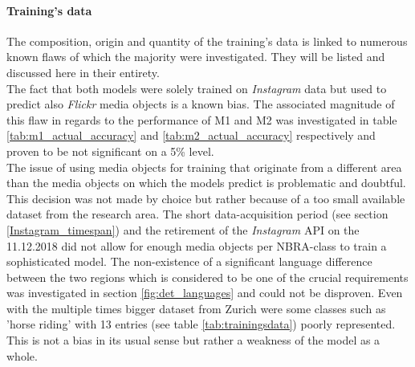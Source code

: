 \paragraph*{Training's data} The composition, origin and quantity of the training's data is linked to numerous known flaws of which the majority were investigated. They will be listed and discussed here in their entirety. \\
The fact that both models were solely trained on \textit{Instagram} data but used to predict also \textit{Flickr} media objects is a known bias. The associated magnitude of this flaw in regards to the performance of M1 and M2 was investigated in table \ref{tab:m1_actual_accuracy} and \ref{tab:m2_actual_accuracy} respectively and proven to be not significant on a 5\% level. \\
The issue of using media objects for training that originate from a different area than the media objects on which the models predict is problematic and doubtful. This decision was not made by choice but rather because of a too small available dataset from the research area. The short data-acquisition period (see section \ref{Instagram_timespan}) and the retirement of the \textit{Instagram} API on the 11.12.2018 did not allow for enough media objects per NBRA-class to train a sophisticated model. The non-existence of a significant language difference between the two regions which is considered to be one of the crucial requirements was investigated in section \ref{fig:det_languages} and could not be disproven.
Even with the multiple times bigger dataset from Zurich were some classes such as 'horse riding' with 13 entries (see table \ref{tab:trainingsdata}) poorly represented. This is not a bias in its usual sense but rather a weakness of the model as a whole.

